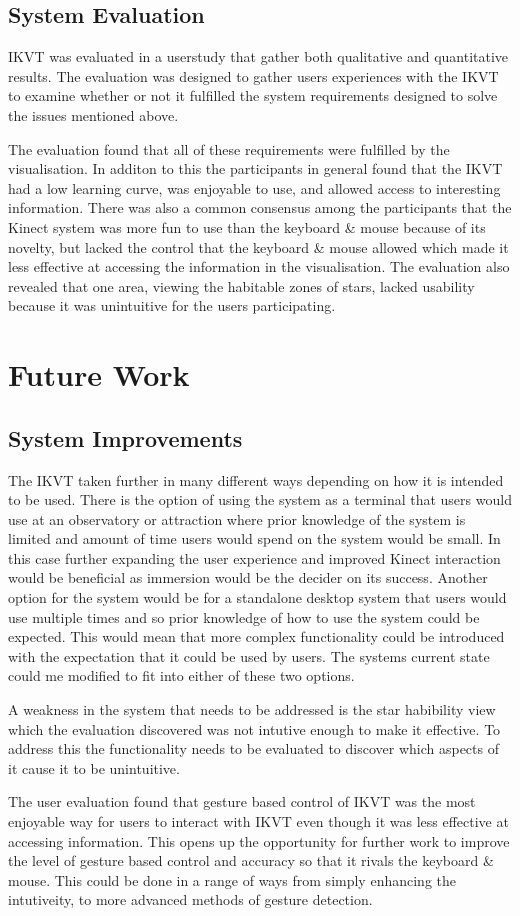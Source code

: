 \subsection{System Evaluation}
IKVT was evaluated in a userstudy that gather both qualitative and quantitative
results. The evaluation was designed to gather users experiences with the IKVT
to examine whether or not it fulfilled the system requirements designed to solve
the issues mentioned above.

The evaluation found that all of these requirements were fulfilled by the
visualisation. In additon to this the participants in general found that the
IKVT had a low learning curve, was enjoyable to use, and allowed
access to interesting information. There was also a common consensus among the
participants that the Kinect system was more fun to use than the keyboard \&
mouse because of its novelty, but lacked the control that the
keyboard \& mouse allowed which made it less effective at accessing the
information in the visualisation. The evaluation also revealed that one area,
viewing the habitable zones of stars, lacked
usability because it was unintuitive for the users participating.
\section{Future Work}
\subsection{System Improvements}
The IKVT taken further in many different ways depending
on how it is intended to be used. There is the option of using the system as a
terminal that users would use at an observatory or attraction where prior
knowledge of the system is limited and amount of time users would spend on the
system would be small. In this case further expanding the user experience and
improved Kinect interaction would be beneficial as immersion would be the
decider on its success. Another option for the system would be for a standalone
desktop system that users would use multiple times and so prior knowledge of how
to use the system could be expected. This would mean that more complex
functionality could be introduced with the expectation that it could be used by
users. The systems current state could me modified to fit into either of these
two options.

A weakness in the system that needs to be addressed is the star habibility view
which the evaluation discovered was not intutive enough to make it effective. To
address this the functionality needs to be evaluated to discover which aspects
of it cause it to be unintuitive.

The user evaluation found that gesture based control of IKVT was the most
enjoyable way for users to interact with IKVT even though it was less effective
at accessing information. This opens up the opportunity for further work to
improve the level of gesture based control and accuracy so that it rivals the
keyboard \& mouse. This could be done in a range of ways from simply enhancing
the intutiveity, to more advanced methods of gesture detection.


